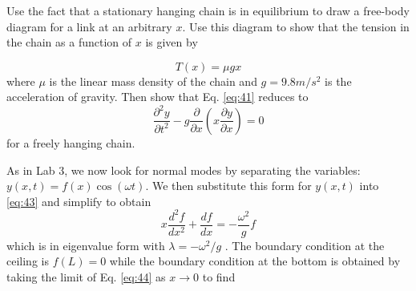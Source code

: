 \begin{problem} \label{P4.1}
Use the fact that a stationary hanging chain is in equilibrium to draw a
free-body diagram for a link at an arbitrary $x$. Use this diagram to show that
the tension in the chain as a function of $x$ is given by

	\begin{equation}\label{eq:42}
		T(x) = \mu g x
				\end{equation}		
				where $\mu$ is the linear mass density of the chain and $g = 9.8 m/s^2$
is the acceleration of gravity. Then show that Eq. \ref{eq:41} reduces to	
	\begin{equation}\label{eq:43}
		 \frac{\partial^2 y}{\partial t^2} - g\frac{\partial}{\partial x}(x\frac{\partial y}{\partial x}) = 0
				\end{equation}	
			for a freely hanging chain. \end{problem}
			As in Lab 3, we now look for normal modes by separating the variables:
$y(x,t) = f(x)\cos(\omega t)$. We then substitute this form for $y(x,t)$ into \ref{eq:43} and simplify to obtain	
		\begin{equation}\label{eq:44}
		 x \frac{d^2 f}{dx^2}+\frac{df}{dx} = - \frac{\omega^2}{g}f
				\end{equation}		
				which is in eigenvalue form with $ \lambda = −\omega^2/g$ . The boundary condition at the
ceiling is $f (L) = 0$ while the boundary condition at the bottom is obtained by
taking the limit of Eq. \ref{eq:44} as $x \rightarrow 0$ to find

